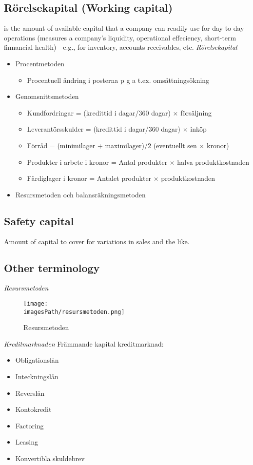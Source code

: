 \documentclass{article}
\newcommand{\imagesPath}{images}
\begin{document}
\subsection{Rörelsekapital (Working capital)}
is the amount of available capital that a company can readily use for 
day-to-day operations (measures a company's liquidity, operational effeciency,
short-term finnancial health) - e.g., for inventory, accounts receivables, etc.
\textit{Rörelsekapital}
\begin{itemize}
    \item Procentmetoden
    \begin{itemize}
        \item Procentuell ändring i posterna p g a t.ex. omsättningsökning
    \end{itemize}
    \item Genomsnittsmetoden
    \begin{itemize}
        \item Kundfordringar = (kredittid i dagar/360 dagar) $\times$ försäljning
        \item Leverantörsskulder = (kredittid i dagar/360 dagar) $\times$ inköp
        \item Förråd = (minimilager + maximilager)/2 (eventuellt sen $\times$ kronor)
        \item Produkter i arbete i kronor = Antal produkter $\times$ halva produktkostnaden
        \item Färdiglager i kronor = Antalet produkter $\times$ produktkostnaden
    \end{itemize}
    \item Resursmetoden och balansräkningsmetoden 
\end{itemize}

\subsection{Safety capital}
Amount of capital to cover for variations in sales and the like.

\subsection{Other terminology}
\textit{Resursmetoden}
\begin{figure}[!h]
    \centering
    \texttt{[image: \\imagesPath/resursmetoden.png]}
    \caption{Resursmetoden}
\end{figure}

\textit{Kreditmarknaden} \newline
Främmande kapital kreditmarknad:
\begin{itemize}
    \item Obligationslån
    \item Inteckningslån 
    \item Reverslån 
    \item Kontokredit 
    \item Factoring
    \item Leasing 
    \item Konvertibla skuldebrev
\end{itemize}
\end{document}
